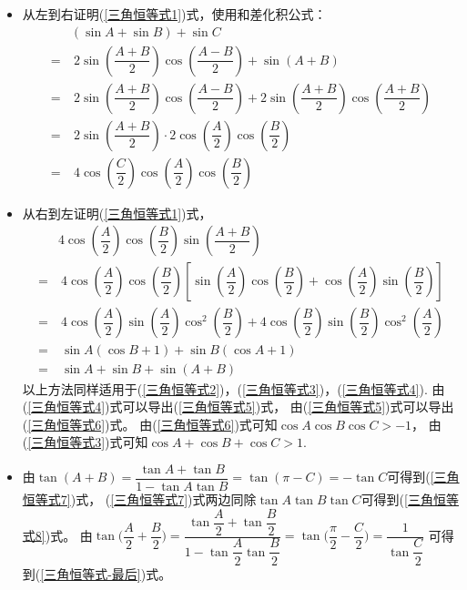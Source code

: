 \begin{itemize}[leftmargin=\inteval{\myitemleftmargin}pt,itemsep=
    \inteval{\myitemitempsep}pt,topsep=\inteval{\myitemtopsep}pt]
\item 从左到右证明(\ref{三角恒等式1})式，使用和差化积公式：
\begin{align*}
    & (\sin A +\sin B) +\sin C  \\
    =&\  2\sin\left(\dfrac{A+B}{2}\right)\cos\left(\dfrac{A-B}{2}\right)+\sin(A+B) \\    
    =&\  2\sin\left(\dfrac{A+B}{2}\right)\cos\left(\dfrac{A-B}{2}\right)+
    2\sin\left(\dfrac{A+B}{2}\right)\cos\left(\dfrac{A+B}{2}\right) \\
    =&\  2\sin\left(\dfrac{A+B}{2}\right)\cdot 2\cos\left(\dfrac{A}{2}\right)\cos\left(\dfrac{B}{2}\right) \\
    =&\  4\cos\left(\dfrac{C}{2}\right)\cos\left(\dfrac{A}{2}\right)\cos\left(\dfrac{B}{2}\right)
\end{align*}
\item 从右到左证明(\ref{三角恒等式1})式，
\begin{align*}
    & 4\cos\left(\dfrac{A}{2}\right)\cos\left(\dfrac{B}{2}\right)\sin\left(\dfrac{A+B}{2}\right) \\
    =&\  4\cos\left(\dfrac{A}{2}\right)\cos\left(\dfrac{B}{2}\right) \left[\sin\left(\dfrac{A}{2}\right) \cos\left(\dfrac{B}{2}\right)+\cos\left(\dfrac{A}{2}\right) \sin\left(\dfrac{B}{2}\right) \right] \\
    =&\  4\cos\left(\dfrac{A}{2}\right)\sin\left(\dfrac{A}{2}\right)\cos^2\left(\dfrac{B}{2}\right)+
    4\cos\left(\dfrac{B}{2}\right)\sin\left(\dfrac{B}{2}\right)\cos^2\left(\dfrac{A}{2}\right)\\
    =&\  \sin A (\cos B+1)+\sin B(\cos A +1) \\
    =&\  \sin A +\sin B + \sin(A+B)
\end{align*}
以上方法同样适用于(\ref{三角恒等式2})，(\ref{三角恒等式3})，(\ref{三角恒等式4}).
由(\ref{三角恒等式4})式可以导出(\ref{三角恒等式5})式，
由(\ref{三角恒等式5})式可以导出(\ref{三角恒等式6})式。
由(\ref{三角恒等式6})式可知$ \cos A\cos B\cos C >-1 $，
由(\ref{三角恒等式3})式可知$ \cos A+\cos B+\cos C >1 $.  

\item 由$ \tan(A+B)=\dfrac{\tan A+\tan B}{1-\tan A\tan B}=
\tan(\pi-C)=-\tan C $可得到(\ref{三角恒等式7})式，
(\ref{三角恒等式7})式两边同除$ \tan A \tan B\tan C $可得到(\ref{三角恒等式8})式。
由$ \tan\Big(\dfrac{A}{2}+\dfrac{B}{2}\Big)=\dfrac{\tan \dfrac{A}{2}+
    \tan \dfrac{B}{2}}{1-\tan \dfrac{A}{2}\tan \dfrac{B}{2}}
=\tan\Big(\dfrac{\pi}{2}-\dfrac{C}{2}\Big)=\dfrac{1}{\tan \dfrac{C}{2}} $
可得到(\ref{三角恒等式-最后})式。


\end{itemize}
